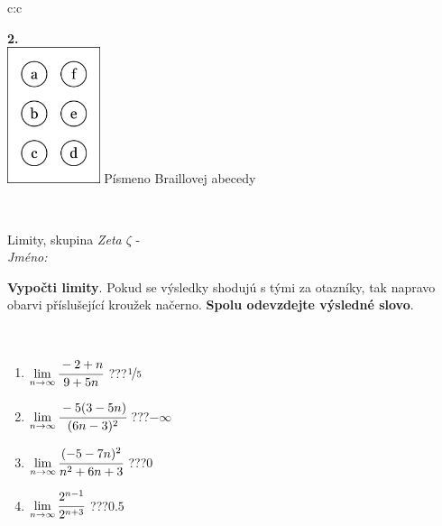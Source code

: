 \documentclass[10pt]{report}
\begin{document}
\begin{tabular}{c:c}
\begin{minipage}[c][104.5mm][t]{0.5\linewidth}
\begin{center}
\begin{minipage}{0.20\linewidth}
\begin{center}
{\Huge\bfseries 2.} \\[2mm]
\includegraphics[height=40mm]{../images/braille.png}
{\small Písmeno Braillovej abecedy}
\end{center}
\end{minipage}
\end{center}
\end{minipage}
\\ \hdashline
\begin{minipage}[c][104.5mm][t]{0.5\linewidth}
\begin{center}
\vspace{7mm}
{\huge Limity, skupina \textit{Zeta $\zeta$} -}\\[5mm]
\textit{Jméno:}\phantom{xxxxxxxxxxxxxxxxxxxxxxxxxxxxxxxxxxxxxxxxxxxxxxxxxxxxxxxxxxxxxxxxx}\\[5mm]
\begin{minipage}{0.95\linewidth}
\begin{center}
\textbf{Vypočti limity}. Pokud se výsledky shodujú s tými za otazníky, tak napravo\\obarvi příslušející kroužek načerno. \textbf{Spolu odevzdejte výsledné slovo}.
\end{center}
\end{minipage}
\\[1mm]
\begin{minipage}{0.79\linewidth}
\begin{center}
\begin{varwidth}{\linewidth}
\begin{enumerate}
\normalsize
\item $\lim\limits_{n\to\infty}\cfrac{-2+n}{9+5n}$\quad \dotfill\; ???\;\dotfill \quad $\nicefrac{1}{5}$
\item $\lim\limits_{n\to\infty}\cfrac{-5(3-5n)}{(6n-3)^2}$\quad \dotfill\; ???\;\dotfill \quad $-\infty$
\item $\lim\limits_{n\to\infty}\cfrac{(-5-7n)^2}{n^2+6n+3}$\quad \dotfill\; ???\;\dotfill \quad $0$
\item $\lim\limits_{n\to\infty}\cfrac{2^{n-1}}{2^{n+3}}$\quad \dotfill\; ???\;\dotfill \quad $0.5$

\end{enumerate}
\end{varwidth}
\end{center}
\end{minipage}
\end{center}
\end{minipage}
\end{tabular}
\end{document}
